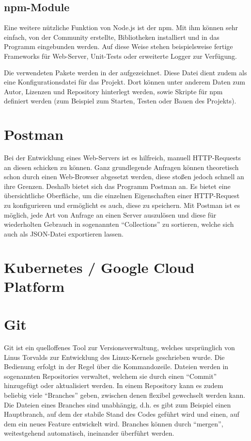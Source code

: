 \subsection{npm-Module}
Eine weitere nützliche Funktion von Node.js ist der \ac{npm}. Mit ihm können sehr einfach, von der Community erstellte, Bibliotheken installiert und in das Programm eingebunden werden. Auf diese Weise stehen beispielsweise fertige Frameworks für Web-Server, Unit-Tests oder erweiterte Logger zur Verfügung.

Die verwendeten Pakete werden in der  aufgezeichnet. Diese Datei dient zudem als eine Konfigurationsdatei für das Projekt. Dort können unter anderem Daten zum Autor, Lizenzen und Repository hinterlegt werden, sowie Skripte für npm definiert werden (zum Beispiel zum Starten, Testen oder Bauen des Projekts).

\section{Postman}
Bei der Entwicklung eines Web-Servers ist es hilfreich, manuell \ac{HTTP}-Requests an diesen schicken zu können. Ganz grundlegende Anfragen können theoretisch schon durch einen Web-Browser abgesetzt werden, diese stoßen jedoch schnell an ihre Grenzen. Deshalb bietet sich das Programm Postman an. Es bietet eine übersichtliche Oberfläche, um die einzelnen Eigenschaften einer \ac{HTTP}-Request zu konfigurieren und ermöglicht es auch, diese zu speichern. Mit Postman ist es möglich, jede Art von Anfrage an einen Server auszulösen und diese für wiederholten Gebrauch in sogenannten \enquote{Collections} zu sortieren, welche sich auch als \ac{JSON}-Datei exportieren lassen.

\section{Kubernetes / Google Cloud Platform}

\section{Git}
Git ist ein quelloffenes Tool zur Versionsverwaltung, welches ursprünglich von Linus Torvalds zur Entwicklung des Linux-Kernels geschrieben wurde. Die Bedienung erfolgt in der Regel über die Kommandozeile. Dateien werden in sogenannten Repositories verwaltet, welchem sie durch einen \enquote{Commit} hinzugefügt oder aktualisiert werden. In einem Repository kann es zudem beliebig viele \enquote{Branches} geben, zwischen denen flexibel gewechselt werden kann. Die Dateien eines Branches sind unabhängig, d.h. es gibt zum Beispiel einen Hauptbranch, auf dem der stabile Stand des Codes geführt wird und einen, auf dem ein neues Feature entwickelt wird. Branches können durch \enquote{mergen}, weitestgehend automatisch, ineinander überführt werden.
